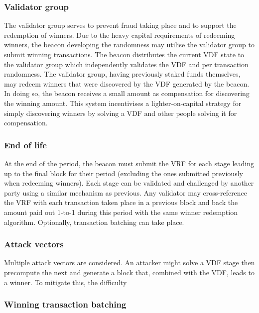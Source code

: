 \subsubsection{Validator group}

The validator group serves to prevent fraud taking place and to support the redemption of winners. Due to the heavy capital requirements of redeeming winners, the beacon developing the randomness may utilise the validator group to submit winning transactions. The beacon distributes the current VDF state to the validator group which independently validates the VDF and per transaction randomness. The validator group, having previously staked funds themselves, may redeem winners that were discovered by the VDF generated by the beacon. In doing so, the beacon receives a small amount as compensation for discovering the winning amount. This system incentivises a lighter-on-capital strategy for simply discovering winners by solving a VDF and other people solving it for compensation.

\subsubsection{End of life}

At the end of the period, the beacon must submit the VRF for each stage leading up to the final block for their period (excluding the ones submitted previously when redeeming winners). Each stage can be validated and challenged by another party using a similar mechanism as previous. Any validator may cross-reference the VRF with each transaction taken place in a previous block and back the amount paid out 1-to-1 during this period with the same winner redemption algorithm. Optionally, transaction batching can take place.

\subsubsection{Attack vectors}

Multiple attack vectors are considered. An attacker might solve a VDF stage then precompute the next and generate a block that, combined with the VDF, leads to a winner. To mitigate this, the difficulty

\subsubsection{Winning transaction batching}

